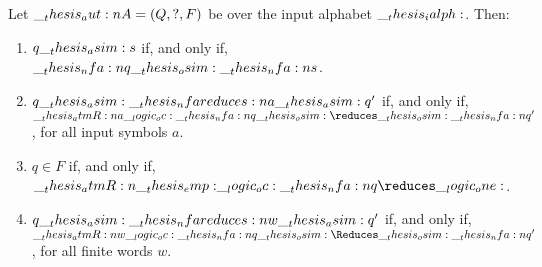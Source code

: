 \begin{theorem}
  Let $\__thesis_aut:n {A} = (Q, ?, F)$ be  over the input alphabet $\__thesis_ialph:$.
  Then:
  \begin{enumerate}
  \item $q \__thesis_asim: s$ if, and only if, $\__thesis_nfa:n {q} \__thesis_osim: \__thesis_nfa:n {s}$.
  \item $q \asim\nfareduces[a]\asim q'$ if, and only if, $\atmR{a} \oc \nfa{q} \osim\reduces\osim \nfa{q}'$, for all input symbols $a$.
  \item $q \in F$ if, and only if, $\atmR{\emp} \oc \nfa{q} \reduces \one$.
  \item $q \asim\nfareduces[w]\asim q'$ if, and only if, $\atmR{w} \oc \nfa{q} \osim\Reduces\osim \nfa{q}'$, for all finite words $w$.
  \end{enumerate}
\end{theorem}
%
